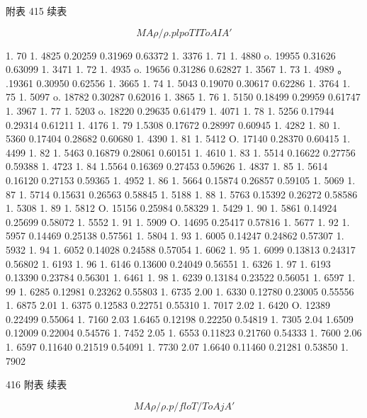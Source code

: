 附表 415 续表

\[M A \rho /\rho .  plpo TITo AIA'\]

1. 70 1. 4825 0.20259 0.31969 0.63372 1. 3376 1. 71 1. 4880 o. 19955 0.31626 0.63099 1. 3471 1. 72 1. 4935 o. 19656 0.31286 0.62827 1. 3567 1. 73 1. 4989 。 .19361 0.30950 0.62556 1. 3665 1. 74 1. 5043 0.19070 0.30617 0.62286 1. 3764 1. 75 1. 5097 o. 18782 0.30287 0.62016 1. 3865 1. 76 1. 5150 0.18499 0.29959 0.61747 1. 3967 1. 77 1. 5203 o. 18220 0.29635 0.61479 1. 4071 1. 78 1. 5256 0.17944 0.29314 0.61211 1. 4176 1. 79 1.5308 0.17672 0.28997 0.60945 1. 4282 1. 80 1. 5360 0.17404 0.28682 0.60680 1. 4390 1. 81 1. 5412 O. 17140 0.28370 0.60415 1. 4499 1. 82 1. 5463 0.16879 0.28061 0.60151 1. 4610 1. 83 1. 5514 0.16622 0.27756 0.59388 1. 4723 1. 84 1.5564 0.16369 0.27453 0.59626 1. 4837 1. 85 1. 5614 0.16120 0.27153 0.59365 1. 4952 1. 86 1. 5664 0.15874 0.26857 0.59105 1. 5069 1. 87 1. 5714 0.15631 0.26563 0.58845 1. 5188 1. 88 1. 5763 0.15392 0.26272 0.58586 1. 5308 1. 89 1. 5812 O. 15156 0.25984 0.58329 1. 5429 1. 90 1. 5861 0.14924 0.25699 0.58072 1. 5552 1. 91 1. 5909 O. 14695 0.25417 0.57816 1. 5677 1. 92 1. 5957 0.14469 0.25138 0.57561 1. 5804 1. 93 1. 6005 0.14247 0.24862 0.57307 1. 5932 1. 94 1. 6052 0.14028 0.24588 0.57054 1. 6062 1. 95 1. 6099 0.13813 0.24317 0.56802 1. 6193 1. 96 1. 6146 0.13600 0.24049 0.56551 1. 6326 1. 97 1. 6193 0.13390 0.23784 0.56301 1. 6461 1. 98 1. 6239 0.13184 0.23522 0.56051 1. 6597 1. 99 1. 6285 0.12981 0.23262 0.55803 1. 6735 2.00 1. 6330 0.12780 0.23005 0.55556 1. 6875 2.01 1. 6375 0.12583 0.22751 0.55310 1. 7017 2.02 1. 6420 O. 12389 0.22499 0.55064 1. 7160 2.03 1.6465 0.12198 0.22250 0.54819 1. 7305 2.04 1.6509 0.12009 0.22004 0.54576 1. 7452 2.05 1. 6553 0.11823 0.21760 0.54333 1. 7600 2.06 1. 6597 0.11640 0.21519 0.54091 1. 7730 2.07 1.6640 0.11460 0.21281 0.53850 1. 7902

416 附表 续表

\[M A \rho / \rho .  p/ flo T/ To Aj A'\]

